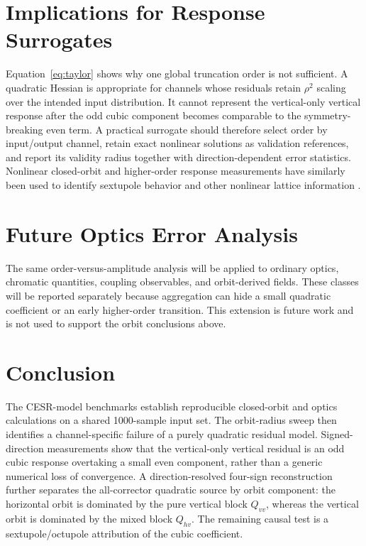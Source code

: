 \documentclass[letterpaper]{jacow}
\begin{document}
\section{Implications for Response Surrogates}

Equation~\eqref{eq:taylor} shows why one global truncation order is not
sufficient.  A quadratic Hessian is appropriate for channels whose residuals
retain $\rho^2$ scaling over the intended input distribution.  It cannot
represent the vertical-only vertical response after the odd cubic component
becomes comparable to the symmetry-breaking even term.  A practical surrogate
should therefore select order by input/output channel, retain exact nonlinear
solutions as validation references, and report its validity radius together
with direction-dependent error statistics.  Nonlinear closed-orbit and
higher-order response measurements have similarly been used to identify
sextupole behavior and other nonlinear lattice information
\cite{olsson2020,huang2024,caliari2025}.

\section{Future Optics Error Analysis}

The same order-versus-amplitude analysis will be applied to ordinary optics,
chromatic quantities, coupling observables, and orbit-derived fields.  These
classes will be reported separately because aggregation can hide a small
quadratic coefficient or an early higher-order transition.  This extension is
future work and is not used to support the orbit conclusions above.

\section{Conclusion}

The CESR-model benchmarks establish reproducible closed-orbit and optics
calculations on a shared 1000-sample input set.  The orbit-radius sweep then
identifies a channel-specific failure of a purely quadratic residual model.
Signed-direction measurements show that the vertical-only vertical residual
is an odd cubic response overtaking a small even component, rather than a
generic numerical loss of convergence.  A direction-resolved four-sign
reconstruction further separates the all-corrector quadratic source by orbit
component: the horizontal orbit is dominated by the pure vertical block
$Q_{vv}$, whereas the vertical orbit is dominated by the mixed block $Q_{hv}$.
The remaining causal test is a sextupole/octupole attribution of the cubic
coefficient.
\end{document}
